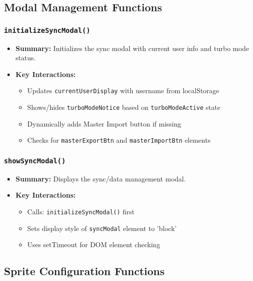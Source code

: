 \documentclass[11pt,letterpaper]{article}
\begin{document}
\subsection{Modal Management Functions}

\subsubsection{\texttt{initializeSyncModal()}}
\begin{itemize}
    \item \textbf{Summary:} Initializes the sync modal with current user info and turbo mode status.
    \item \textbf{Key Interactions:}
    \begin{itemize}
        \item Updates \texttt{currentUserDisplay} with username from localStorage
        \item Shows/hides \texttt{turboModeNotice} based on \texttt{turboModeActive} state
        \item Dynamically adds Master Import button if missing
        \item Checks for \texttt{masterExportBtn} and \texttt{masterImportBtn} elements
    \end{itemize}
\end{itemize}

\subsubsection{\texttt{showSyncModal()}}
\begin{itemize}
    \item \textbf{Summary:} Displays the sync/data management modal.
    \item \textbf{Key Interactions:}
    \begin{itemize}
        \item Calls: \texttt{initializeSyncModal()} first
        \item Sets display style of \texttt{syncModal} element to 'block'
        \item Uses setTimeout for DOM element checking
    \end{itemize}
\end{itemize}

\subsection{Sprite Configuration Functions}
\end{document}
